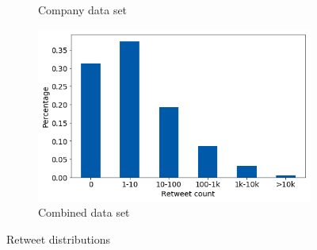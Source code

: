 \begin{figure}[h]
\begin{subfigure}{.45\textwidth}
  \caption{Company data set}
  \label{fig:retw_distr_sub3}
\end{subfigure}%
\begin{subfigure}{.45\textwidth}
  \includegraphics[width=.95\linewidth]{img/comb_retw_distr}
  \caption{Combined data set}
  \label{fig:retw_distr_sub4}
\end{subfigure}%
\caption{Retweet distributions}
\label{fig:retw_distr}
\end{figure}

